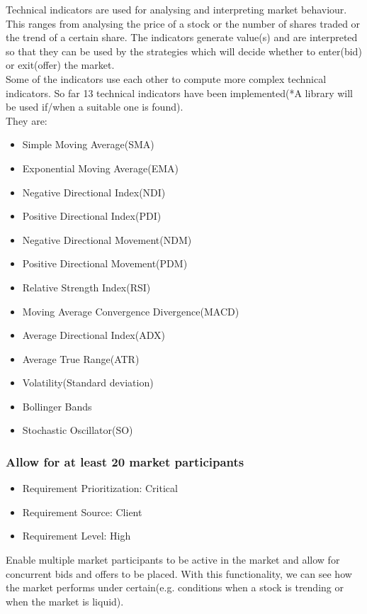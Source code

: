 \documentclass[12pt]{article}
\begin{document}
				Technical indicators are used for analysing and interpreting market behaviour. This ranges from analysing the price of a stock or the number of shares traded or the trend of a certain share. The indicators generate value(s) and are interpreted so that they can be used by the strategies which will decide whether to enter(bid) or exit(offer) the market.\\
				Some of the indicators use each other to compute more complex technical indicators. So far 13 technical indicators have been implemented(*A library will be used if/when a suitable one is found).\\
				They are:
				\begin{itemize}
					\item Simple Moving Average(SMA)
					\item Exponential Moving Average(EMA)
					\item Negative Directional Index(NDI) 
					\item Positive Directional Index(PDI)
					\item Negative Directional Movement(NDM)
					\item Positive Directional Movement(PDM)
					\item Relative Strength Index(RSI)
					\item Moving Average Convergence Divergence(MACD)
					\item Average Directional Index(ADX)
					\item Average True Range(ATR)
					\item Volatility(Standard deviation)
					\item Bollinger Bands
					\item Stochastic Oscillator(SO)	
				\end{itemize} 								
				
				\subsubsection{Allow for at least 20 market participants}
				\begin{itemize}
					\item Requirement Prioritization: Critical
					\item Requirement Source: Client
					\item Requirement Level: High 	
				\end{itemize}
				Enable multiple market participants to be active in the market and allow for concurrent bids and offers to be placed. With this functionality, we can see how the market performs under certain(e.g. conditions when a stock is trending or when the market is liquid). \\
				
\end{document}
